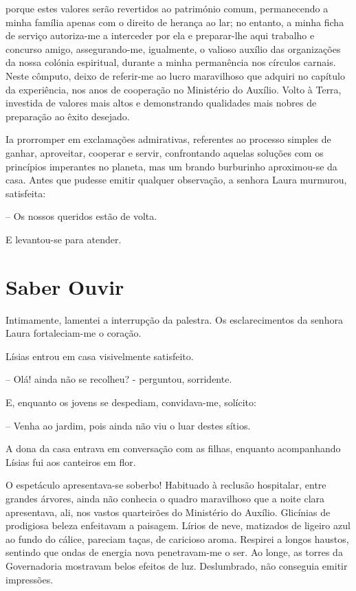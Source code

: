 \documentclass[portuguese,12pt,a4paper]{scrbook}
\begin{document}
	
	porque estes valores serão revertidos ao património comum, permanecendo a minha família apenas com o direito de herança ao lar; no entanto, a minha ficha de serviço autoriza-me a interceder por ela e preparar-lhe aqui trabalho e concurso amigo, assegurando-me, igualmente, o valioso auxílio das organizações da nossa colónia espiritual, durante a minha permanência nos círculos carnais. Neste cômputo, deixo de referir-me ao lucro maravilhoso que adquiri no capítulo da experiência, nos anos de cooperação no Ministério do Auxílio. Volto à Terra, investida de valores mais altos e demonstrando qualidades mais nobres de preparação ao êxito desejado.
	
	Ia prorromper em exclamações admirativas, referentes ao processo simples de ganhar, aproveitar, cooperar e servir, confrontando aquelas soluções com os princípios imperantes no planeta, mas um brando burburinho aproximou-se da casa. Antes que pudesse emitir qualquer observação, a senhora Laura murmurou, satisfeita:
	
	– Os nossos queridos estão de volta.
	
	E levantou-se para atender.
	
	
	\chapter{Saber Ouvir}
	
	Intimamente, lamentei a interrupção da palestra. Os esclarecimentos da senhora Laura fortaleciam-me o coração.
	
	Lísias entrou em casa visivelmente satisfeito.
	
	– Olá! ainda não se recolheu? - perguntou, sorridente.
	
	E, enquanto os jovens se despediam, convidava-me, solícito:
	
	– Venha ao jardim, pois ainda não viu o luar destes sítios.
	
	A dona da casa entrava em conversação com as filhas, enquanto acompanhando Lísias fui aos canteiros em flor.
	
	O espetáculo apresentava-se soberbo! Habituado à reclusão hospitalar, entre grandes árvores, ainda não conhecia o quadro maravilhoso que a noite clara apresentava, ali, nos vastos quarteirões do Ministério do Auxílio. Glicínias de prodigiosa beleza enfeitavam a paisagem. Lírios de neve, matizados de ligeiro azul ao fundo do cálice, pareciam taças, de caricioso aroma. Respirei a longos haustos, sentindo que ondas de energia nova penetravam-me o ser. Ao longe, as torres da Governadoria mostravam belos efeitos de luz. Deslumbrado, não conseguia emitir impressões.
	
\end{document}
